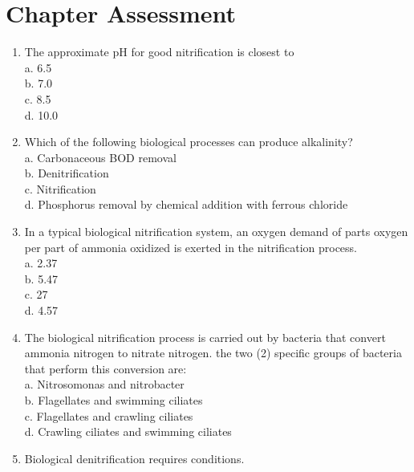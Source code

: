 \section*{Chapter Assessment}
\begin{tcolorbox}[breakable, enhanced,
colframe=blue!25,
colback=blue!10,
coltitle=blue!20!black,  
title= Chapter Assessment]

\begin{enumerate}
\item The approximate pH for good nitrification is closest to \\

a. 6.5 \\
b. 7.0 \\
c. 8.5 \\
d. 10.0 

\item Which of the following biological processes can produce alkalinity? \\

a. Carbonaceous BOD removal \\
b. Denitrification \\
c. Nitrification \\
d. Phosphorus removal by chemical addition with ferrous chloride 

\item In a typical biological nitrification system, an oxygen demand of {\underline{\hspace{1cm}}} parts oxygen per part of ammonia oxidized is exerted in the nitrification process. \\

a. 2.37 \\
b. 5.47 \\
c. 27 \\
d. 4.57 

\item The biological nitrification process is carried out by bacteria that convert ammonia nitrogen to nitrate nitrogen. the two (2) specific groups of bacteria that perform this conversion are: \\

a. Nitrosomonas and nitrobacter \\
b. Flagellates and swimming ciliates \\
c. Flagellates and crawling ciliates \\
d. Crawling ciliates and swimming ciliates 

\item Biological denitrification requires {\underline{\hspace{1cm}}} conditions. \\


\end{enumerate}
\end{tcolorbox}
